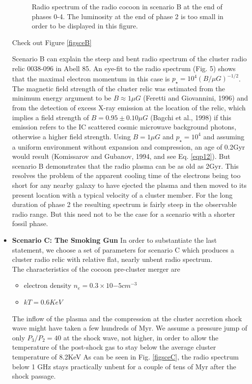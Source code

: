 \documentclass[12pt]{report}
\newcommand{\cbox}{tcolorbox}
\begin{document}
\begin{itemize}
\begin{figure}[h!]
\caption{Radio spectrum of the radio cocoon in scenario B at the end of phases 0-4.  The luminosity at the end of phase 2 is too small in order to be displayed in this figure.}
\end{figure}
Check out Figure \ref{figsceB}
\begin{\cbox}
Scenario B can explain the steep and bent radio spectrum of the cluster radio relic 0038-096 in Abell 85. An eye-fit to the radio spectrum (Fig. 5) shows that the maximal electron momentum in this case is $p_\star = 10^4 (B/\mu G)^{-1/2}$. The magnetic field strength of the cluster relic was estimated from the minimum energy argument to be $B \approx 1\mu G$ (Feretti and Giovannini, 1996) and from the detection of excess X-ray emission at the location of the relic, which implies a field strength of $B = 0.95 \pm 0.10\mu G$ (Bagchi et al., 1998) if this emission refers to the IC scattered cosmic microwave background photons, otherwise a higher field strength. Using $B = 1\mu G$ and $p_\star = 10^4$ and assuming a uniform environment without expansion and compression, an age of 0.2Gyr would result (Komissarov and Gubanov, 1994, and see Eq. \eqref{eqp12}). But scenario B demonstrates that the radio plasma can be as old as 2Gyr. This resolves the problem of the apparent cooling time of the electrons being too short for any nearby galaxy to have ejected the plasma and then moved to its present location with a typical velocity of a cluster member. For the long duration of phase 2 the resulting spectrum is fairly steep in the observable radio range. But this need not to be the case for a scenario with a shorter fossil phase. 
\end{\cbox}
\item \textbf{Scenario C: The Smoking Gun}
 In order to substantiate the last statement, we choose a set of parameters for scenario C which produces a cluster radio relic with relative flat, nearly unbent radio spectrum.\\
 The characteristics of the cocoon pre-cluster merger are
 \begin{itemize}
 \item electron density $n_e=0.3 \times 10{-5}cm^{-3}$\\
 \item $kT=0.6KeV$
\end{itemize}  
 The inflow of the plasma and the compression at the cluster accretion shock wave might have taken a few hundreds of Myr. We assume a pressure jump of only $P_3/P_2 = 40$ at the shock wave, not higher, in order to allow the temperature of the post-shock gas to stay below the average cluster temperature of 8.2KeV  As can be seen in Fig. \ref{figsceC}, the radio spectrum below 1 GHz stays practically unbent for a couple of tens of Myr after the shock passage.

\end{itemize}
\end{document}
